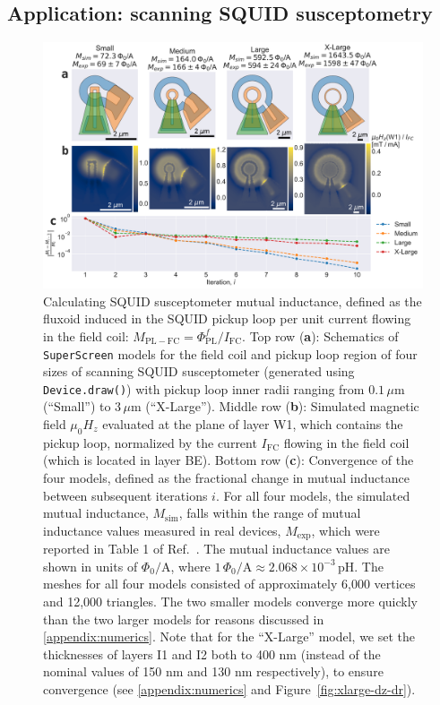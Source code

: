 \documentclass[final,3p,times,twocolumn]{elsarticle}
\newcommand{\inline}[1]{\texttt{#1}\xspace}
\newcommand{\SuperScreen}{\inline{SuperScreen}}
\newcommand{\um}{\mu\mathrm{m}}
\begin{document}
\subsection{Application: scanning SQUID susceptometry}
\label{section:examples:scanning-squid}

\begin{figure}[t]
    \centering
    \includegraphics[width=\textwidth]{examples/images/squid-mutuals.pdf}
    \caption{Calculating SQUID susceptometer mutual inductance, defined as the fluxoid induced in the SQUID pickup loop per unit current flowing in the field coil: $M_\mathrm{PL-FC}=\Phi^f_\mathrm{PL} / I_\mathrm{FC}$. Top row ({\bf a}): Schematics of \SuperScreen models for the field coil and pickup loop region of four sizes of scanning SQUID susceptometer (generated using \inline{Device.draw()}) with pickup loop inner radii ranging from $0.1\,\um$ (``Small'') to $3\,\um$ (``X-Large''). Middle row ({\bf b}): Simulated magnetic field $\mu_0H_z$ evaluated at the plane of layer W1, which contains the pickup loop, normalized by the current $I_\mathrm{FC}$ flowing in the field coil (which is located in layer BE). Bottom row ({\bf c}): Convergence of the four models, defined as the fractional change in mutual inductance between subsequent iterations $i$. For all four models, the simulated mutual inductance, $M_\mathrm{sim}$, falls within the range of mutual inductance values measured in real devices, $M_\mathrm{exp}$, which were reported in Table 1 of Ref.~\cite{Kirtley2016-zz}. The mutual inductance values are shown in units of $\Phi_0 / \mathrm{A}$, where $1\,\Phi_0 / \mathrm{A}\approx2.068\times10^{-3}\,\mathrm{pH}$. The meshes for all four models consisted of approximately 6,000 vertices and 12,000 triangles. The two smaller models converge more quickly than the two larger models for reasons discussed in \ref{appendix:numerics}. Note that for the ``X-Large'' model, we set the thicknesses of layers I1 and I2 both to 400 nm (instead of the nominal values of 150 nm and 130 nm respectively), to ensure convergence (see \ref{appendix:numerics} and Figure~\ref{fig:xlarge-dz-dr}).}
    \label{fig:squid-mutuals}
\end{figure}
\end{document}
